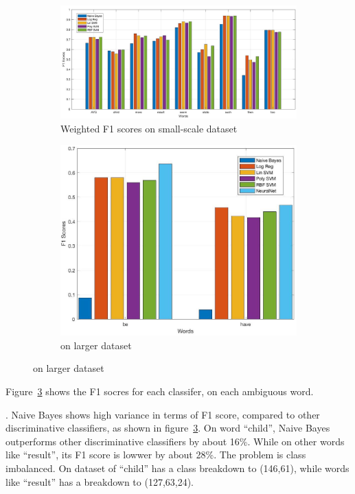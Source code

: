 \begin{figure}[t!]
    \centering
  \begin{subfigure}[t]{0.68\textwidth}
    \includegraphics[width=\textwidth]{plots/f1.jpg}
    \caption{Weighted F1 scores on small-scale dataset}
    \label{fig:results:f1}
\end{subfigure}
  \begin{subfigure}[t]{0.3\textwidth}
    \includegraphics[width=\textwidth]{plots/f1_large.jpg}
    \caption{on larger dataset}
    \label{fig:results:f1}
\end{subfigure}
\end{figure}

Figure~\ref{fig:results:f1} shows the F1 socres for each classifer,
on each ambiguous word.

.
Naive Bayes shows high variance in terms of F1 score, compared to other
discriminative classifiers, as shown in figure~\ref{fig:results:f1}.
On word ``child'', Naive Bayes outperforms other discriminative classifiers by
about 16\%.
While on other words like ``result'', its F1 score is lowwer by about 28\%.
The problem is class imbalanced. 
On dataset of ``child'' has a class breakdown to (146,61), while words like
``result'' has a breakdown to (127,63,24).
